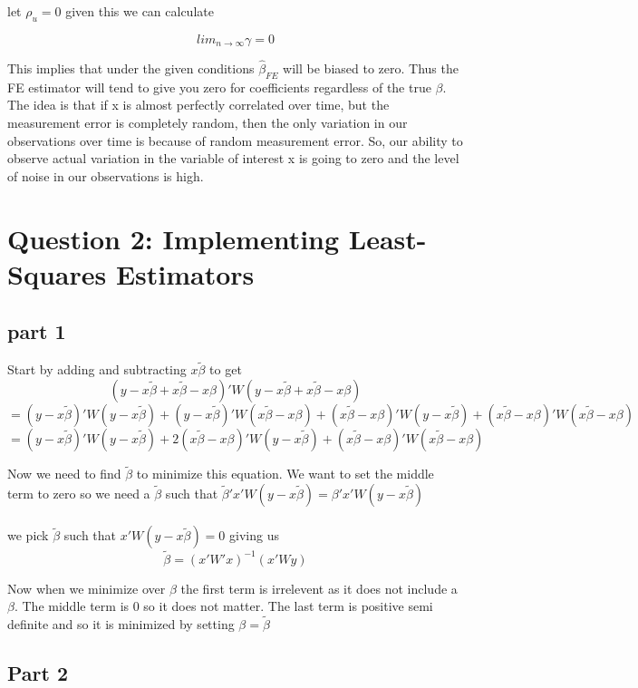 \documentclass[11pt]{article}
\begin{document}
let $\rho_u = 0$ given this we can calculate

$$ lim_{n\to\infty} \gamma = 0$$

This implies that under the given conditions $\hat{\beta}_{FE}$ will be biased to zero. Thus the FE estimator will tend to give you zero for coefficients regardless of the true $\beta$.
The idea is that if x is almost perfectly correlated over time, but the measurement error is completely random, then the only variation in our observations over time is because of random measurement error. So, our ability to observe actual variation in the variable of interest x is going to zero and the level of noise in our observations is high. 



\section{Question 2: Implementing Least-Squares Estimators}

\subsection{part 1}

Start by adding and subtracting $x \tilde{\beta}$ to get 
$$ (y-x\tilde{\beta} + x\tilde{\beta} - x\beta)'W(y-x\tilde{\beta} + x\tilde{\beta} - x\beta) $$
$$ = (y-x\tilde{\beta})'W(y-x\tilde{\beta}) + (y-x\tilde{\beta})'W(x\tilde{\beta} - x\beta) + (x\tilde{\beta} - x\beta)'W(y-x\tilde{\beta}) + (x\tilde{\beta} - x\beta)'W(x\tilde{\beta} - x\beta)$$
$$ = (y-x\tilde{\beta})'W(y-x\tilde{\beta}) + 2(x\tilde{\beta} - x\beta)'W(y-x\tilde{\beta}) + (x\tilde{\beta} - x\beta)'W(x\tilde{\beta} - x\beta)$$

Now we need to find $\tilde{\beta}$ to minimize this equation. We want to set the middle term to zero so we need a $\tilde{\beta}$ such that $\tilde{\beta}'x'W(y-x\tilde{\beta}) = \beta'x'W(y-x\tilde{\beta})$
\\ \\ 
we pick $\tilde{\beta}$ such that $x'W(y-x\tilde{\beta}) = 0$ giving us $$\tilde{\beta}=(x'W'x)^{-1}(x'Wy)$$

Now when we minimize over $\beta$ the first term is irrelevent as it does not include a $\beta$. The middle term is 0 so it does not matter. The last term is positive semi definite and so it is minimized by setting $\beta = \tilde{\beta}$

\subsection{Part 2}
\end{document}
